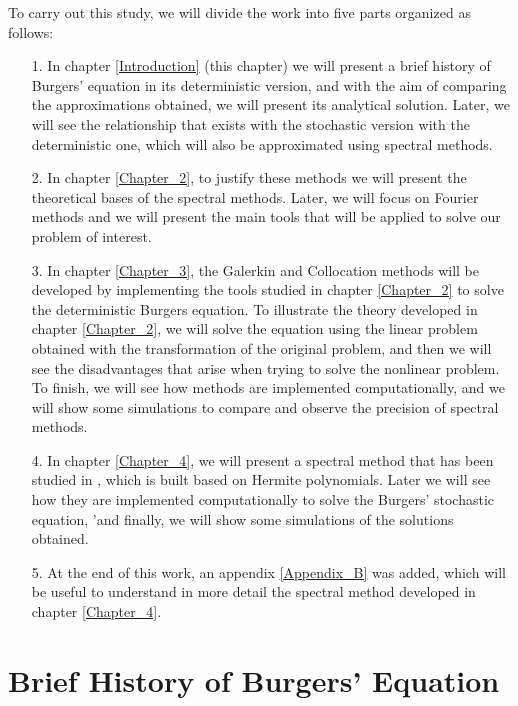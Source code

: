 	To carry out this study, we will divide the work into five parts organized as follows:
	\begin{enumerate}
		\item[1.] In chapter \ref{Introduction} (this chapter) we will present a brief history of Burgers' equation in its deterministic version, and with the aim of comparing the approximations obtained, we will present its analytical solution. Later, we will see the relationship that exists with the stochastic version with the deterministic one, which will also be approximated using spectral methods.
		
		\item[2.] In chapter \ref{Chapter_2}, to justify these methods we will present the theoretical bases of the spectral methods. Later, we will focus on Fourier methods and we will present the main tools that will be applied to solve our problem of interest.
		
		\item[3.] In chapter \ref{Chapter_3}, the Galerkin and Collocation methods will be developed by implementing the tools studied in chapter \ref{Chapter_2} to solve the deterministic Burgers equation. To illustrate the theory developed in chapter \ref{Chapter_2}, we will solve the equation using the linear problem obtained with the transformation of the original problem, and then we will see the disadvantages that arise when trying to solve the nonlinear problem. To finish, we will see how methods are implemented computationally, and we will show some simulations to compare and observe the precision of spectral methods.
		
		\item[4.] In chapter \ref{Chapter_4}, we will present a spectral method that has been studied in \cite{Delgado2016}, which is built based on Hermite polynomials. Later we will see how they are implemented computationally to solve the Burgers' stochastic equation, 'and finally, we will show some simulations of the solutions obtained.
		
		\item[5.] At the end of this work, an appendix \ref{Appendix_B} was added, which will be useful to understand in more detail the spectral method developed in chapter \ref{Chapter_4}.
	\end{enumerate}

    \section{Brief History of Burgers' Equation}
    
